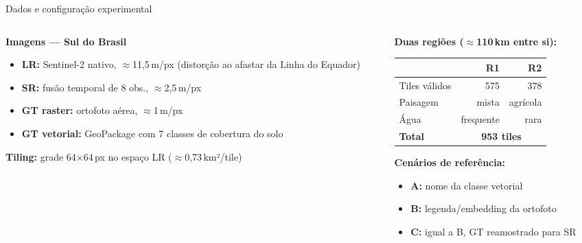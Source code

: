 \documentclass[aspectratio=169]{beamer}
\begin{document}
\begin{frame}{Dados e configuração experimental}

  \begin{columns}[T]
    \begin{column}{0.50\textwidth}
      \textbf{Imagens — Sul do Brasil}
      \begin{itemize}
        \item \textbf{LR:} Sentinel-2 nativo, $\approx$11{,}5\,m/px (distorção ao afastar da Linha do Equador)
        \item \textbf{SR:} fusão temporal de 8 obs., $\approx$2{,}5\,m/px
        \item \textbf{GT raster:} ortofoto aérea, $\approx$1\,m/px
        \item \textbf{GT vetorial:} GeoPackage com 7 classes de cobertura do solo
      \end{itemize}
      \vspace{0.4em}
      \textbf{Tiling:} grade 64×64\,px no espaço LR ($\approx$0{,}73\,km²/tile)
    \end{column}
    \begin{column}{0.47\textwidth}
      \textbf{Duas regiões ($\approx$110\,km entre si):}
      \vspace{0.2em}
      \begin{tabular}{lrr}
        \toprule
        & \textbf{R1} & \textbf{R2} \\
        \midrule
        Tiles válidos & 575 & 378 \\
        Paisagem & mista & agrícola \\
        Água & frequente & rara \\
        \midrule
        \textbf{Total} & \multicolumn{2}{c}{\textbf{953 tiles}} \\
        \bottomrule
      \end{tabular}
      \vspace{0.4em}

      \textbf{Cenários de referência:}
      \begin{itemize}\small
        \item \textbf{A:} nome da classe vetorial
        \item \textbf{B:} legenda/embedding da ortofoto
        \item \textbf{C:} igual a B, GT reamostrado para SR
      \end{itemize}
    \end{column}
  \end{columns}

\end{frame}
\end{document}
